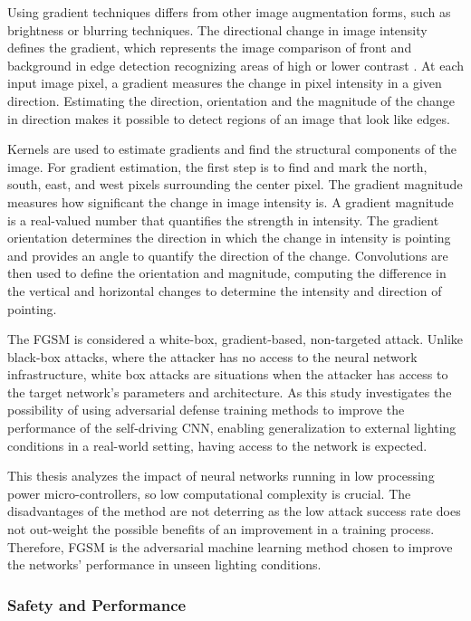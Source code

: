 \documentclass[12pt]{article}
\begin{document}
Using gradient techniques differs from other image augmentation forms, such as brightness or blurring techniques. The directional change in image intensity defines the gradient, which represents the image comparison of front and background in edge detection recognizing areas of high or lower contrast \parencite{gradient}. At each input image pixel, a gradient measures the change in pixel intensity in a given direction. Estimating the direction, orientation and the magnitude of the change in direction makes it possible to detect regions of an image that look like edges. 

Kernels are used to estimate gradients and find the structural components of the image. For gradient estimation, the first step is to find and mark the north, south, east, and west pixels surrounding the center pixel. The gradient magnitude measures how significant the change in image intensity is. A gradient magnitude is a real-valued number that quantifies the strength in intensity.
The gradient orientation determines the direction in which the change in intensity is pointing and provides an angle to quantify the direction of the change. Convolutions are then used to define the orientation and magnitude, computing the difference in the vertical and horizontal changes to determine the intensity and direction of pointing.

The FGSM is considered a white-box, gradient-based, non-targeted attack. Unlike black-box attacks, where the attacker has no access to the neural network infrastructure, white box attacks are situations when the attacker has access to the target network's parameters and architecture. As this study investigates the possibility of using adversarial defense training methods to improve the performance of the self-driving CNN, enabling generalization to external lighting conditions in a real-world setting, having access to the network is expected.

This thesis analyzes the impact of neural networks running in low processing power micro-controllers, so low computational complexity is crucial. The disadvantages of the method are not deterring as the low attack success rate does not out-weight the possible benefits of an improvement in a training process. Therefore, FGSM is the adversarial machine learning method chosen to improve the networks' performance in unseen lighting conditions. 

\subsubsection{Safety and Performance}
\end{document}
